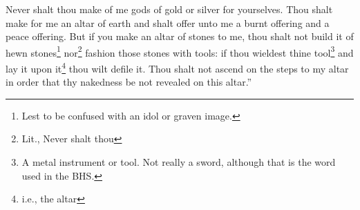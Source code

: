 \begin{enumerate}[align=center]
     Never shalt thou make of me gods of gold or silver for yourselves.%
     Thou shalt make for me an altar of earth and shalt offer unto me a burnt offering and a peace offering.%
     But if you make an altar of stones to me, thou shalt not build it of hewn stones\footnote{Lest to be confused with an idol or graven image.} nor\footnote{Lit., Never shalt thou} fashion those stones with tools: if thou wieldest thine tool\footnote{A metal instrument or tool. Not really a sword, although that is the word used in the BHS.} and lay it upon it\footnote{i.e., the altar} thou wilt defile it.%
     Thou shalt not ascend on the steps to my altar in order that thy nakedness be not revealed on this altar.''%
\end{enumerate}
